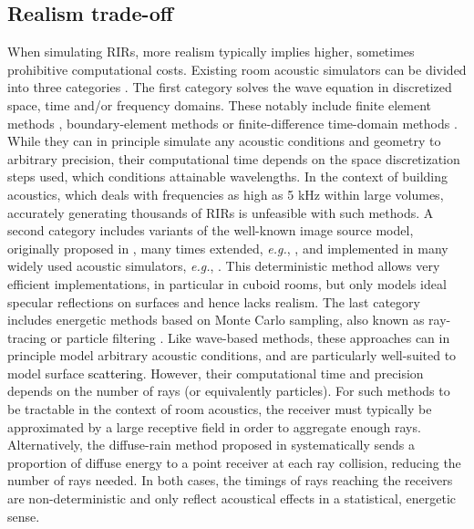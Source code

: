 \documentclass[reprint]{JASA}
\makeatletter
\newif\ifnotes
\newcommand{\note}[1]{\@bsphack\ifnotes{#1}\fi\@esphack}
\makeatother
\begin{document}
\subsection{Realism trade-off}
\label{subsec:sim}
When simulating RIRs, more realism typically implies higher, sometimes prohibitive computational costs. Existing room acoustic simulators can be divided into three categories \cite{habets2006room}. The first category solves the wave equation in discretized space, time and/or frequency domains. These notably include finite element methods \cite{okuzono2014finite}, boundary-element methods \cite{pietrzyk1998computer} or finite-difference time-domain methods \cite{botteldooren1995finite}. While they can in principle simulate any acoustic conditions and geometry to arbitrary precision, their computational time depends on the space discretization steps used, which conditions attainable wavelengths. In the context of building acoustics, which deals with frequencies as high as 5 kHz within large volumes, accurately generating thousands of RIRs is unfeasible with such methods. A second category includes variants of the well-known image source model, originally proposed in \cite{allen1979image}, many times extended, \textit{e.g.}, \cite{peterson1986simulating,borish1984extension,samarasinghe2018spherical}, and implemented in many widely used acoustic simulators, \textit{e.g.}, 
\cite{schimmel2009fast,habets2006room,scheibler2018pyroomacoustics}. This deterministic method allows very efficient implementations, in particular in cuboid rooms, but only models ideal specular reflections on surfaces and hence lacks realism. The last category includes energetic methods based on Monte Carlo sampling, also known as ray-tracing or particle filtering \cite{kulowski1985algorithmic,schroder2011physically,schimmel2009fast}. Like wave-based methods, these approaches can in principle model arbitrary acoustic conditions, and are particularly well-suited to model surface
\note{\sout{diffusion}}
\textcolor{black}{scattering}. However, their computational time and precision depends on the number of rays (or equivalently particles). For such methods to be tractable in the context of room acoustics, the receiver must typically be approximated by a large receptive field in order to aggregate enough rays.
Alternatively, the diffuse-rain method proposed in \cite{schroder2011physically} systematically sends a proportion of diffuse energy to a point receiver at each ray collision, reducing the number of rays needed. In both cases, the timings of rays reaching the receivers are non-deterministic and only reflect acoustical effects in a statistical, energetic sense. 
\end{document}
